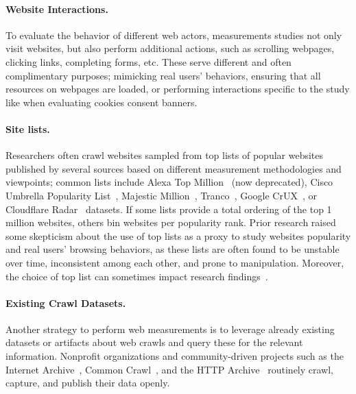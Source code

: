 \paragraph{Website Interactions.}
To evaluate the behavior of different web actors, measurements studies not only visit websites, but also perform additional actions, such as scrolling webpages, clicking links, completing forms, etc. These serve different and often complimentary purposes; mimicking real users' behaviors, ensuring that all resources on webpages are loaded, or performing interactions specific to the study like when evaluating cookies consent banners.

\paragraph{Site lists.}
Researchers often crawl websites sampled from top lists of popular websites published by several sources based on different measurement methodologies and viewpoints; common lists include Alexa Top Million~\cite{amazonAlexa} (now deprecated), Cisco Umbrella Popularity List~\cite{ciscoCiscoUmbrellaPopularity}, Majestic Million~\cite{majesticMajesticMillion}, Tranco~\cite{lepochatTrancoResearchOrientedTop2019}, Google CrUX~\cite{googleChromeUXReport2017}, or Cloudflare Radar~\cite{cloudflareCloudflareRadar2025} datasets. If some lists provide a total ordering of the top 1 million websites, others bin websites per popularity rank. Prior research raised some skepticism about the use of top lists as a proxy to study websites popularity and real users' browsing behaviors, as these lists are often found to be unstable over time, inconsistent among each other, and prone to manipulation. Moreover, the choice of top list can sometimes impact research findings~\cite{lepochatTrancoResearchOrientedTop2019,ruthTopplingTopLists2022}.

\paragraph{Existing Crawl Datasets.}
Another strategy to perform web measurements is to leverage already existing datasets or artifacts about web crawls and query these for the relevant information. Nonprofit organizations and community-driven projects such as the Internet Archive~\cite{InternetArchiveDigital}, Common Crawl~\cite{commoncrawlCommonCrawlOpen}, and the HTTP Archive~\cite{httparchiveHTTPArchive} routinely crawl, capture, and publish their data openly.

